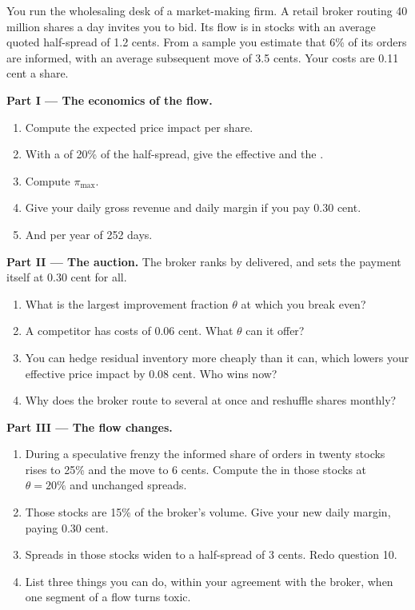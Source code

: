 \begin{problem}\label{pb:m1:retail-flow-and-wholesaling:1}
You run the wholesaling desk of a market-making firm. A retail broker routing
40 million shares a day invites you to bid. Its flow is in stocks with an
average quoted half-spread of 1.2 cents. From a sample you estimate that 6\%
of its orders are informed, with an average subsequent move of 3.5 cents.
Your costs are 0.11 cent a share.

\medskip\noindent\textbf{Part I --- The economics of the flow.}
\begin{enumerate}
\item Compute the expected price impact per share.
\item With a  of 20\% of the half-spread, give the
effective and the .
\item Compute $\pi_{\max}$.
\item Give your daily gross revenue and daily margin if you pay 0.30 cent.
\item And per year of 252 days.
\end{enumerate}

\medskip\noindent\textbf{Part II --- The auction.}
The broker ranks  by  delivered, and sets the
payment itself at 0.30 cent for all.
\begin{enumerate}[resume]
\item What is the largest improvement fraction $\theta$ at which you break
even?
\item A competitor has costs of 0.06 cent. What $\theta$ can it offer?
\item You can hedge residual inventory more cheaply than it can, which lowers
your effective price impact by 0.08 cent. Who wins now?
\item Why does the broker route to several  at once and reshuffle
shares monthly?
\end{enumerate}

\medskip\noindent\textbf{Part III --- The flow changes.}
\begin{enumerate}[resume]
\item During a speculative frenzy the informed share of orders in twenty
stocks rises to 25\% and the move to 6 cents. Compute the  in those stocks at $\theta = 20\%$ and unchanged spreads.
\item Those stocks are 15\% of the broker's volume. Give your new daily
margin, paying 0.30 cent.
\item Spreads in those stocks widen to a half-spread of 3 cents. Redo
question 10.
\item List three things you can do, within your agreement with the broker,
when one segment of a flow turns toxic.
\end{enumerate}


\end{problem}

